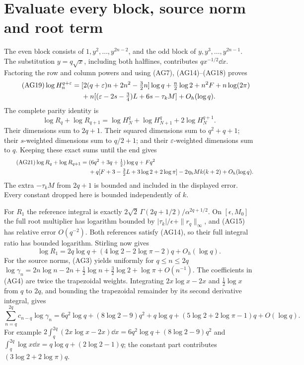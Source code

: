 \section{Evaluate every block, source norm and root term}
The even block consists of $1,y^2,\ldots,y^{2n-2}$, and the odd block of
$y,y^3,\ldots,y^{2n-1}$. The substitution $y=q\sqrt x$, including both
halflines, contributes $q x^{-1/2}\dd x$.
Factoring the row and column powers and using (AG7), (AG14)--(AG18) proves
\begin{align}\tag{AG19}
 \log H_n^{q+\varepsilon}
 ={}&[2(q+\varepsilon)n+2n^2-\tfrac32n]\log q
       +\tfrac n2\log2+n^2F+n\log(2\pi)\\
 &+n[(\varepsilon-2s-\tfrac34)L+6s-\tau_kM]
       +O_h(\log q).\notag
\end{align}
The complete parity identity is
\begin{equation}\tag{AG20}
 \log R_q+\log R_{q+1}
 =\log H_N^q+\log H_{N+1}^q+2\log H_N^{q+1}.
\end{equation}
Their dimensions sum to $2q+1$. Their squared dimensions sum to
$q^2+q+1$; their $s$-weighted dimensions sum to $q/2+1$;
and their $\varepsilon$-weighted dimensions sum to $q$.
Keeping these exact sums until the end gives
\begin{align}\tag{AG21}
 \log R_q+\log R_{q+1}
 ={}&(6q^2+3q+\tfrac12)\log q+Fq^2\\
 &+q[F+3-\tfrac32L+3\log2+2\log\pi]
       -2\eta_h M k(k+2)+O_h(\log q).\notag
\end{align}
The extra $-\tau_kM$ from $2q+1$ is bounded and included in the displayed
error. Every constant dropped here is bounded independently of $k$.

For $R_1$ the reference integral is exactly
$2\sqrt2\,\Gamma(2q+1/2)/\alpha^{2q+1/2}$.
On $[\epsilon,M_0]$ the full root multiplier has logarithm bounded by
$|\tau_k|/\epsilon+\|r_q\|_\infty$, and (AG15) has relative error $O(q^{-2})$.
Both references satisfy (AG14), so their full integral ratio has bounded
logarithm. Stirling now gives
\begin{equation}\tag{AG22}
 \log R_1=2q\log q+(4\log2-2\log\pi-2)q+O_h(\log q).
\end{equation}
For the source norms, (AG3) yields uniformly for $q\le n\le2q$
$\log\gamma_n=2n\log n-2n+\tfrac12\log n+\tfrac32\log2+\log\pi+O(n^{-1})$.
The coefficients in (AG4) are twice the trapezoidal weights. Integrating
$2x\log x-2x$ and $\tfrac12\log x$ from $q$ to $2q$, and bounding the
trapezoidal remainder by its second derivative integral, gives
\begin{equation}\tag{AG23}
 \sum_{n=q}^{2q}c_{n-q}\log\gamma_n
 =6q^2\log q+(8\log2-9)q^2
  +q\log q+(5\log2+2\log\pi-1)q+O(\log q).
\end{equation}
For example $2\int_q^{2q}(2x\log x-2x)\dd x
=6q^2\log q+(8\log2-9)q^2$ and
$\int_q^{2q}\log x\dd x=q\log q+(2\log2-1)q$;
the constant part contributes $(3\log2+2\log\pi)q$.


